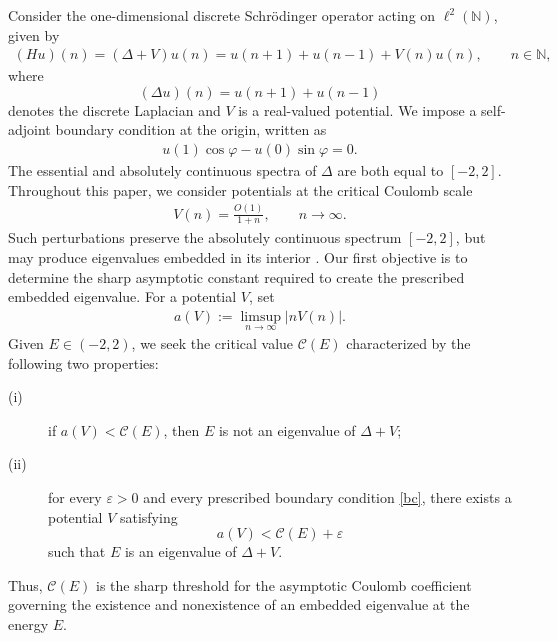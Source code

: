 \documentclass[12pt]{amsart}
\theoremstyle{plain}
\theoremstyle{definition}
\begin{document}
Consider the one-dimensional discrete Schr\"odinger operator acting on $\ell^2(\mathbb N)$, given by
\begin{align}\label{maineq}
	(Hu)(n)
	=(\Delta +V)u(n)
	=u(n+1)+u(n-1)+V(n)u(n),
	\qquad n\in\mathbb N,
\end{align}
where
\[
(\Delta u)(n)=u(n+1)+u(n-1)
\]
denotes the discrete Laplacian and $V$ is a real-valued potential. We impose a self-adjoint
boundary condition at the origin, written as
\begin{align}\label{bc}
	u(1)\cos\varphi-u(0)\sin\varphi=0.
\end{align}
The essential and absolutely continuous spectra of $\Delta$ are both
equal to $[-2,2]$. Throughout this paper, we consider potentials at the
critical Coulomb scale
\begin{align}
	V(n)=\frac{O(1)}{1+n},
	\qquad n\to\infty.
	\nonumber
\end{align}
Such perturbations preserve the absolutely continuous spectrum $[-2,2]$,
but may produce eigenvalues embedded in its interior \cite{RemlingCMP,LiuDiscrete,DeiftKillip,KillipSimon}.
Our first objective is to determine the sharp asymptotic constant required to
create the prescribed embedded eigenvalue. For a potential $V$, set
\begin{align}
	a(V):=\limsup_{n\to\infty}|nV(n)|.
	\nonumber
\end{align}
Given $E\in(-2,2)$, we seek the critical value $\mathcal C(E)$ characterized by
the following two properties:
\begin{description}
	\item[(i)] if $a(V)<\mathcal C(E)$, then $E$ is not an eigenvalue of
	$\Delta+V$;
	
	\item[(ii)] for every $\varepsilon>0$ and every prescribed boundary
	condition \eqref{bc}, there exists a potential $V$ satisfying
	\[
	a(V)<\mathcal C(E)+\varepsilon
	\]
	such that $E$ is an eigenvalue of $\Delta+V$.
\end{description}
Thus, $\mathcal C(E)$ is the sharp threshold for the asymptotic Coulomb coefficient governing the existence and nonexistence of an embedded eigenvalue at the energy $E$.
\end{document}

